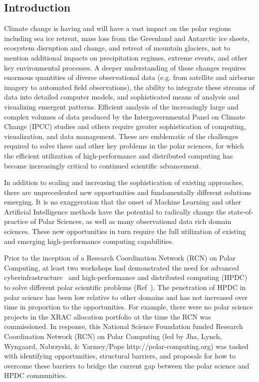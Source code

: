 \documentclass[10pt,letterpaper,draft]{article}
\begin{document}
\vspace{0.15in}

\subsection*{Introduction}

Climate change is having and will have a vast impact on the polar regions including sea ice retreat, mass loss from the Greenland and Antarctic ice sheets, ecosystem disruption and change, and retreat of mountain glaciers, not to mention additional impacts on precipitation regimes, extreme events, and other key environmental processes. A deeper understanding of these changes requires enormous quantities of diverse observational data (e.g. from satellite and airborne imagery to automated field observations), the ability to integrate these streams of data into detailed computer models, and sophisticated means of analysis and visualizing emergent patterns.  Efficient analysis of the increasingly large and complex volumes of data produced by the Intergovernmental Panel on Climate Change (IPCC) studies and others require greater sophistication of computing, visualization, and data management. These are emblematic of the challenges required to solve these and other key problems in the polar sciences, for which the efficient utilization of high-performance and distributed computing has become increasingly critical to continued scientific advancement.

In addition to scaling and increasing the sophistication of existing approaches, there are unprecedented new opportunities and fundamentally different solutions emerging. It is no exaggeration that the onset of Machine Learning and other Artificial Intelligence methods have the potential to radically change the state-of-practice of Polar Sciences, as well as many observational data rich domain sciences.  These new opportunities in turn require the full utilization of existing and emerging high-performance computing capabilities. 

Prior to the inception of a Research Coordination Network (RCN) on Polar Computing, at least two workshops had demonstrated the need for advanced cyberinfrastructure~\cite{Skytland2016-jk} and high-performance and distributed computing (HPDC) to solve different polar scientific problems (Ref~\cite{hackathon_guide,Leckart2015-go}). The penetration of HPDC in polar science has been low relative to other domains and has not increased over time in proportion to the opportunities. For example, there were no polar science projects in the XRAC allocation portfolio at the time the RCN was commissioned. In response, this National Science Foundation funded Research Coordination Network (RCN) on Polar Computing (led by Jha, Lynch, Wyngaard, Nabrzyski, \& Yarmey/Pope http://polar-computing.org) was tasked with identifying opportunities, structural barriers, and proposals for how to overcome these barriers to bridge the current gap between the polar science and HPDC communities.
\end{document}
